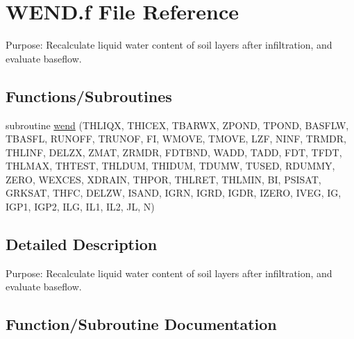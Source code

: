 \hypertarget{WEND_8f}{}\section{W\+E\+N\+D.\+f File Reference}
\label{WEND_8f}


Purpose\+: Recalculate liquid water content of soil layers after infiltration, and evaluate baseflow.  


\subsection*{Functions/\+Subroutines}
\begin{DoxyCompactItemize}
\item 
subroutine \hyperlink{WEND_8f_aef71fcd76a2c9c23bd3d07a80231ca8b}{wend} (T\+H\+L\+I\+Q\+X, T\+H\+I\+C\+E\+X, T\+B\+A\+R\+W\+X, Z\+P\+O\+N\+D, T\+P\+O\+N\+D, B\+A\+S\+F\+L\+W, T\+B\+A\+S\+F\+L, R\+U\+N\+O\+F\+F, T\+R\+U\+N\+O\+F, F\+I, W\+M\+O\+V\+E, T\+M\+O\+V\+E, L\+Z\+F, N\+I\+N\+F, T\+R\+M\+D\+R, T\+H\+L\+I\+N\+F, D\+E\+L\+Z\+X, Z\+M\+A\+T, Z\+R\+M\+D\+R, F\+D\+T\+B\+N\+D, W\+A\+D\+D, T\+A\+D\+D, F\+D\+T, T\+F\+D\+T, T\+H\+L\+M\+A\+X, T\+H\+T\+E\+S\+T, T\+H\+L\+D\+U\+M, T\+H\+I\+D\+U\+M, T\+D\+U\+M\+W, T\+U\+S\+E\+D, R\+D\+U\+M\+M\+Y, Z\+E\+R\+O, W\+E\+X\+C\+E\+S, X\+D\+R\+A\+I\+N, T\+H\+P\+O\+R, T\+H\+L\+R\+E\+T, T\+H\+L\+M\+I\+N, B\+I, P\+S\+I\+S\+A\+T, G\+R\+K\+S\+A\+T, T\+H\+F\+C, D\+E\+L\+Z\+W, I\+S\+A\+N\+D, I\+G\+R\+N, I\+G\+R\+D, I\+G\+D\+R, I\+Z\+E\+R\+O, I\+V\+E\+G, I\+G, I\+G\+P1, I\+G\+P2, I\+L\+G, I\+L1, I\+L2, J\+L, N)
\end{DoxyCompactItemize}


\subsection{Detailed Description}
Purpose\+: Recalculate liquid water content of soil layers after infiltration, and evaluate baseflow. 



\subsection{Function/\+Subroutine Documentation}
\hypertarget{WEND_8f_aef71fcd76a2c9c23bd3d07a80231ca8b}{}
